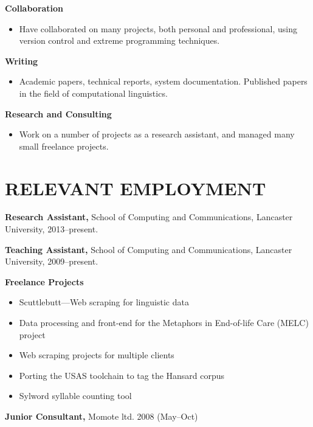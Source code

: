 \documentclass{res}
\begin{document}
\begin{resume}
  {\bf Collaboration}
    \begin{itemize}
      \item[] Have collaborated on many projects, both personal and professional, using
          version control and extreme programming techniques.
      \end{itemize}

  {\bf Writing}
    \begin{itemize} %
      \item[] Academic papers, technical reports, system documentation.
        Published papers in the field of computational linguistics.
      \end{itemize}


   {\bf  Research and Consulting} 
        \begin{itemize}
        \item[] Work on a number of projects as a research assistant, and managed many small freelance projects.
       \end{itemize} 
 
\section{RELEVANT EMPLOYMENT} 
\vspace{0.1in} 

    {\bf Research Assistant,} 
    School of Computing and Communications, 
    Lancaster University, 
    2013--present.

    {\bf Teaching Assistant,} 
    School of Computing and Communications, 
    Lancaster University, 
    2009--present.

    {\bf Freelance Projects} 
    \begin{itemize}
        \item Scuttlebutt---Web scraping for linguistic data
        \item Data processing and front-end for the Metaphors in End-of-life Care (MELC) project
        \item Web scraping projects for multiple clients
        \item Porting the USAS toolchain to tag the Hansard corpus
        \item Sylword syllable counting tool
    \end{itemize}
    
    {\bf Junior Consultant,} 
    Momote ltd.
    2008 (May--Oct)


\end{resume}
\end{document}

